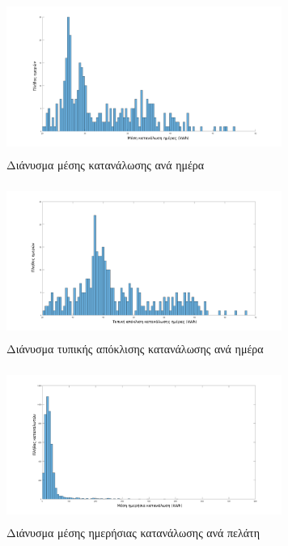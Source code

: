 \begin{figure}[ht!]
 \begin{subfigure}[b]{0.4\textwidth}
 \includegraphics[width=90mm, height=50mm]{../../plots/Consumption_Analysis/gr_hist_mean_days.png}
\caption{Διάνυσμα μέσης κατανάλωσης ανά ημέρα}
\label{fig:histmeandays}
 \end{subfigure}
\quad
 \begin{subfigure}[b]{0.4\textwidth}
 	\includegraphics[width=90mm, height=50mm]{../../plots/Consumption_Analysis/gr_hist_std_days.png}
	\caption{Διάνυσμα τυπικής απόκλισης κατανάλωσης ανά ημέρα}
	\label{fig:histstddays}
	\end{subfigure}
\quad
 \begin{subfigure}[b]{0.4\textwidth}
 \includegraphics[width=90mm, height=50mm]{../../plots/Consumption_Analysis/gr_hist_mean_year.png}
\caption{Διάνυσμα μέσης ημερήσιας κατανάλωσης ανά πελάτη}
\label{fig:histmeanyear}
 \end{subfigure}
\quad
 \begin{subfigure}[b]{0.4\textwidth}

\end{subfigure}
\end{figure}
